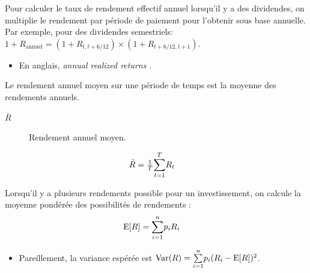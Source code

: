 \documentclass[10pt, french]{article}
\begin{document}
\begin{multicols*}{2}
\begin{definitionNOHFILL}
\begin{definitionNOHFILLsub}
Pour calculer le taux de rendement effectif annuel lorsqu'il y a des dividendes, on multiplie le rendement par période de paiement pour l'obtenir sous base annuelle.	\\

Par exemple, pour des dividendes semestriels: $1 + R_{\text{annuel}}	=	(1 + R_{t, t + 6/12}) \times (1 + R_{t + 6/12, t + 1})$.

\begin{itemize}
	\item	En anglais, \og \textit{annual realized returns} \fg{}.
\end{itemize}
\end{definitionNOHFILLsub}

\begin{definitionNOHFILLsub}
Le rendement annuel moyen sur une période de temps est la moyenne des rendements annuels.

\begin{distributions}[Notation]
\begin{description}
	\item[$\bar{R}$]	Rendement annuel moyen.
\end{description}
\end{distributions}

\begin{align*}
	\bar{R}
	&=	\tfrac{1}{T} \overset{T}{\underset{t	=	1}{\sum}}R_{t}
\end{align*}
\end{definitionNOHFILLsub}
\end{definitionNOHFILL}

\begin{definitionNOHFILL}
Lorsqu'il y a plusieurs rendements possible pour un investissement, on calcule la moyenne pondérée des possibilités de rendements : 
\begin{align*}
	\text{E}[R]
	&=	\overset{n}{\underset{i	=	1}{\sum}} p_{i}R_{i}
\end{align*}

\begin{itemize}
	\item	Pareillement, la variance espérée est $\text{Var}(R)	=	\overset{n}{\underset{i	=	1}{\sum}} p_{i}(R_{i}	-	\text{E}[R])^{2}$.
\end{itemize}
\end{definitionNOHFILL}


\end{multicols*}
\end{document}
